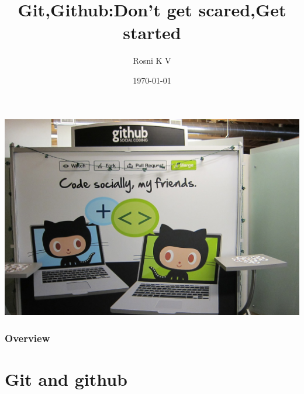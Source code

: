 \documentclass{beamer}
\title[Short title]{Git,Github:Don't get scared,Get started } %
\author{Rosni K V} %
\institute[FOSS cell] %
{
Govt. Engg College , Sreekrishnapuram \\ %
\medskip
\textit{rosnikv@gmail.com} %
}
\date{\today} %
\begin{document}
\begin{frame}
\titlepage %
\begin{center}
 \includegraphics[scale=0.1]{GitHub.jpg}
\end{center}
\end{frame}

\begin{frame}
\frametitle{Overview}%
\tableofcontents %
\end{frame}


\section{Git and github} %
\end{document}
